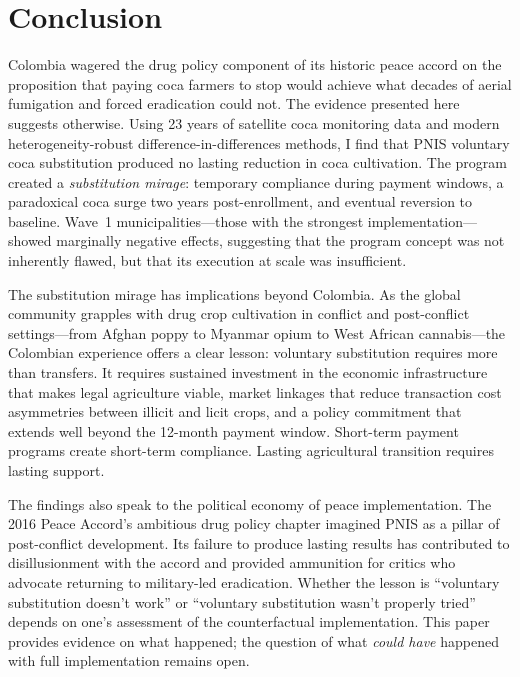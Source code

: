 \documentclass[12pt]{article}
\begin{document}
\section{Conclusion}

Colombia wagered the drug policy component of its historic peace accord on the proposition that paying coca farmers to stop would achieve what decades of aerial fumigation and forced eradication could not. The evidence presented here suggests otherwise. Using 23 years of satellite coca monitoring data and modern heterogeneity-robust difference-in-differences methods, I find that PNIS voluntary coca substitution produced no lasting reduction in coca cultivation. The program created a \emph{substitution mirage}: temporary compliance during payment windows, a paradoxical coca surge two years post-enrollment, and eventual reversion to baseline. Wave~1 municipalities---those with the strongest implementation---showed marginally negative effects, suggesting that the program concept was not inherently flawed, but that its execution at scale was insufficient.

The substitution mirage has implications beyond Colombia. As the global community grapples with drug crop cultivation in conflict and post-conflict settings---from Afghan poppy to Myanmar opium to West African cannabis---the Colombian experience offers a clear lesson: voluntary substitution requires more than transfers. It requires sustained investment in the economic infrastructure that makes legal agriculture viable, market linkages that reduce transaction cost asymmetries between illicit and licit crops, and a policy commitment that extends well beyond the 12-month payment window. Short-term payment programs create short-term compliance. Lasting agricultural transition requires lasting support.

The findings also speak to the political economy of peace implementation. The 2016 Peace Accord's ambitious drug policy chapter imagined PNIS as a pillar of post-conflict development. Its failure to produce lasting results has contributed to disillusionment with the accord and provided ammunition for critics who advocate returning to military-led eradication. Whether the lesson is ``voluntary substitution doesn't work'' or ``voluntary substitution wasn't properly tried'' depends on one's assessment of the counterfactual implementation. This paper provides evidence on what happened; the question of what \emph{could have} happened with full implementation remains open.

\label{apep_main_text_end}
\end{document}
